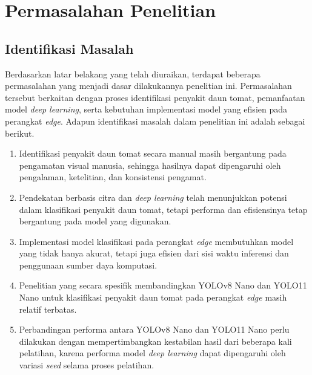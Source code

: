 \section{Permasalahan Penelitian}
\begin{sectioncontent}
    \subsection{Identifikasi Masalah}
    \begin{subsectioncontent}
        \hspace{\parindent}Berdasarkan latar belakang yang telah diuraikan, terdapat beberapa permasalahan yang menjadi dasar dilakukannya penelitian ini. Permasalahan tersebut berkaitan dengan proses identifikasi penyakit daun tomat, pemanfaatan model \textit{deep learning}, serta kebutuhan implementasi model yang efisien pada perangkat \textit{edge}. Adapun identifikasi masalah dalam penelitian ini adalah sebagai berikut.

        \begin{enumerate}[leftmargin=0.75cm,label=\arabic*.]
            \item Identifikasi penyakit daun tomat secara manual masih bergantung pada pengamatan visual manusia, sehingga hasilnya dapat dipengaruhi oleh pengalaman, ketelitian, dan konsistensi pengamat.
            \item Pendekatan berbasis citra dan \textit{deep learning} telah menunjukkan potensi dalam klasifikasi penyakit daun tomat, tetapi performa dan efisiensinya tetap bergantung pada model yang digunakan.
            \item Implementasi model klasifikasi pada perangkat \textit{edge} membutuhkan model yang tidak hanya akurat, tetapi juga efisien dari sisi waktu inferensi dan penggunaan sumber daya komputasi.
            \item Penelitian yang secara spesifik membandingkan YOLOv8 Nano dan YOLO11 Nano untuk klasifikasi penyakit daun tomat pada perangkat \textit{edge} masih relatif terbatas.
            \item Perbandingan performa antara YOLOv8 Nano dan YOLO11 Nano perlu dilakukan dengan mempertimbangkan kestabilan hasil dari beberapa kali pelatihan, karena performa model \textit{deep learning} dapat dipengaruhi oleh variasi \textit{seed} selama proses pelatihan.
        \end{enumerate}
    \end{subsectioncontent}


\end{sectioncontent}
